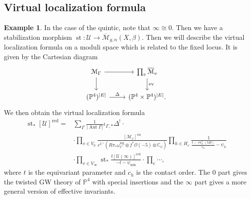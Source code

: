 \documentclass[10pt,oldfontcommands,oneside]{memoir}
\theoremstyle{definition}
\newtheorem{exm}[thm]{Example}
\theoremstyle{remark}
\theoremstyle{plain}
\theoremstyle{definition}
\theoremstyle{remark}
\newcommand{\C}{\mathbb{C}}
\renewcommand{\P}{\mathbb{P}}
\newcommand{\Mbar}{\overline{\mathcal{M}}}
\newcommand{\mc}[1]{\mathcal{#1}}
\newcommand{\mr}[1]{\mathrm{#1}}
\newcommand{\on}[1]{\operatorname{#1}}
\newcommand{\1}{\mathbf{1}}
\newcommand{\2}{\mathbf{2}}
\newcommand{\3}{\mathbf{3}}
\newcommand{\vir}{\mr{vir}}
\newcommand{\red}{\mr{red}}
\DeclareMathOperator{\Aut}{Aut}
\DeclareMathOperator{\ev}{ev}
\begin{document}
\subsection{Virtual localization formula}%
\label{sub:Virtual localization formula}


\begin{exm}
    In the case of the quintic, note that $\infty \cong 0$. Then we have a stabilization morphism $\on{st} \colon\mc{U} \to \Mbar_{g,n}(X,\beta)$. Then we will describe the virtual localization formula on a moduli space which is related to the fixed locus. It is given by the Cartesian diagram
    \begin{equation*}
    \begin{tikzcd}
        \mc{M}_{\Gamma} \ar{r} \ar{d} & \prod_v \Mbar_v \ar{d}{\ev} \\
        (\P^4)^{|E|} \ar{r}{\Delta} & (\P^4 \times \P^4)^{|E|}.
    \end{tikzcd}
    \end{equation*}
    We then obtain the virtual localization formula
    \begin{align*}
        \on{st}_* [\mc{U}]^{\red} ={}& \sum_{\Gamma} \frac{1}{|\Aut \Gamma|} \iota_{\Gamma,*} \Delta^! \cdot \\
        &\cdot \prod_{v \in V_0} \frac{[\mc{M}_v]^{\vir}}{e^{\C^{\times}}(R\pi_* \omega_C^{\log} \otimes f^* \mc{O}(-5) \otimes \C_{\omega})} \prod_{h \in H_v} \frac{1}{\frac{ t-\ev_h^*(5H) }{c_h} - \psi_h} \\
        &\cdot \prod_{v \in V_{\infty}} \on{st}_* \frac{t [\mc{U}(\infty)]^{\red}}{-t-\psi_{\min}} 
        \cdot \prod_{e} \cdots,
    \end{align*}
    where $t$ is the equivariant parameter and $c_h$ is the contact order. The $0$ part gives the twisted GW theory of $\P^4$ with special insertions and the $\infty$ part gives a more general version of effective invariants.
\end{exm}
\end{document}
